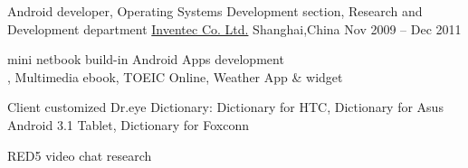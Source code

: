 \begin{cventries}
	\cventry
	{Android developer, Operating Systems Development section, Research and Development department}
	{\href{http://www.inventec.com/english/indexEN.htm}{Inventec Co. Ltd.}}
	{Shanghai,\enskip China}
	{Nov 2009 – Dec 2011}
	{
		\begin{cvitems}
			\item {\href{http://www.androidcentral.com/android-powered-dr-eye-makes-its-debut}{\color{deepblue}{Dr.eye}} mini netbook build-in Android Apps development\\
			\href{https://play.google.com/store/apps/details?id=com.inventec.dreye.dictnew}{\color{deepblue}{Dr.eye Dictionary}}, Multimedia ebook, TOEIC Online, Weather App \& widget}
			\item {Client customized Dr.eye Dictionary:\enskip
			Dictionary for HTC,\enskip 
			Dictionary for Asus Android 3.1 Tablet,\enskip
			Dictionary for Foxconn}
			\item {RED5 video chat research}
		\end{cvitems}
	}
\end{cventries}


